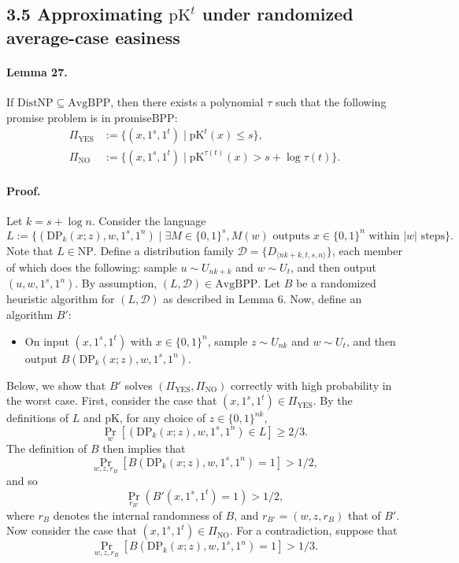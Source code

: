 \subsection*{3.5 Approximating $\mathrm{pK}^t$ under randomized average-case easiness}
\paragraph{Lemma 27.} If $\mathrm{DistNP}\subseteq\mathrm{AvgBPP}$, then there exists a polynomial $\tau$ such that the following promise problem is in promiseBPP:
\begin{align*}
\Pi_{\mathrm{YES}}&:=\{(x,1^s,1^t)\mid\mathrm{pK}^t(x)\leq s\},\\
\Pi_{\mathrm{NO}}&:=\{(x,1^s,1^t)\mid\mathrm{pK}^{\tau(t)}(x)>s+\log\tau(t)\}.
\end{align*}
\paragraph{Proof.} Let $k=s+\log n$. Consider the language
\[L:=\{(\mathrm{DP}_k(x;z),w,1^s,1^n)\mid\exists M\in\{0,1\}^s,M(w)\text{ outputs }x\in\{0,1\}^n\text{ within }|w|\text{ steps}\}.\]
Note that $L\in\mathrm{NP}$. Define a distribution family $\mathcal D=\{D_{\langle nk+k,t,s,n\rangle}\}$, each member of which does the following: sample $u\sim U_{nk+k}$ and $w\sim U_t$, and then output $(u,w,1^s,1^n)$. By assumption, $(L,\mathcal D)\in\mathrm{AvgBPP}$. Let $B$ be a randomized heuristic algorithm for $(L,\mathcal D)$ as described in Lemma 6.
Now, define an algorithm $B'$:
\begin{itemize}
\item On input $(x,1^s,1^t)$ with $x\in\{0,1\}^n$, sample $z\sim U_{nk}$ and $w\sim U_t$, and then output $B(\mathrm{DP}_k(x;z),w,1^s,1^n)$.
\end{itemize}
Below, we show that $B'$ solves $(\Pi_{\mathrm{YES}},\Pi_{\mathrm{NO}})$ correctly with high probability in the worst case.
First, consider the case that $(x,1^s,1^t)\in\Pi_{\mathrm{YES}}$. By the definitions of $L$ and pK, for any choice of $z\in\{0,1\}^{nk}$,
\[\Pr_w[(\mathrm{DP}_k(x;z),w,1^s,1^n)\in L]\geq2/3.\]
The definition of $B$ then implies that
\[\Pr_{w,z,r_B}[B(\mathrm{DP}_k(x;z),w,1^s,1^n)=1]>1/2,\]
and so
\[\Pr_{r_{B'}}(B'(x,1^s,1^t)=1)>1/2,\tag{13}\]
where $r_B$ denotes the internal randomness of $B$, and $r_{B'}=(w,z,r_B)$ that of $B'$.
Now consider the case that $(x,1^s,1^t)\in\Pi_{\mathrm{NO}}$. For a contradiction, suppose that
\[\Pr_{w,z,r_B}[B(\mathrm{DP}_k(x;z),w,1^s,1^n)=1]>1/3.\tag{14}\]
